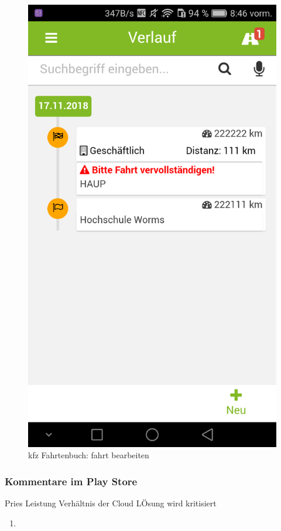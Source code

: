 \documentclass[a4paper]{article}
\begin{document}
\begin{figure}[H]
\begin{minipage}[b]{.4\linewidth}
        \includegraphics[scale=0.14]{img/kfz4}
        \caption{\label{img:img/kfz4}kfz Fahrtenbuch: fahrt bearbeiten}
    \end{minipage}
\end{figure}

\subsubsection{Kommentare im Play Store}
Pries Leistung Verhältnis der Cloud LÖsung wird kritisiert
\begin{enumerate}
    \item
\end{enumerate}
\end{document}
